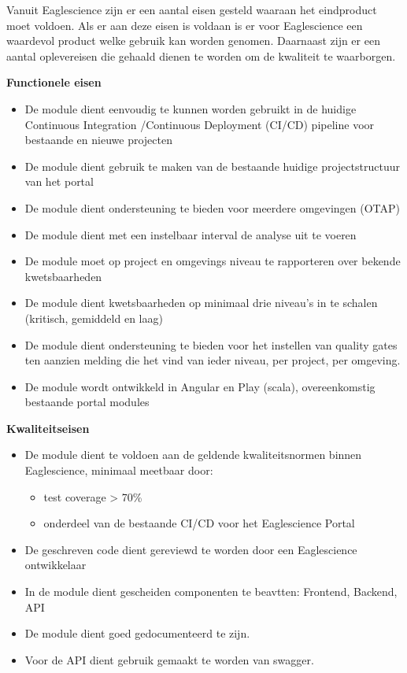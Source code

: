Vanuit Eaglescience zijn er een aantal eisen gesteld waaraan het eindproduct moet voldoen.
Als er aan deze eisen is voldaan is er voor Eaglescience een waardevol product welke gebruik kan worden genomen.
Daarnaast zijn er een aantal oplevereisen die gehaald dienen te worden om de kwaliteit te waarborgen.

\textbf{Functionele eisen}
\begin{itemize}
\item De module dient eenvoudig te kunnen worden gebruikt in de huidige Continuous Integration /Continuous Deployment (CI/CD) pipeline voor bestaande en nieuwe projecten
\item De module dient gebruik te maken van de bestaande huidige projectstructuur van het portal
\item De module dient ondersteuning te bieden voor meerdere omgevingen (OTAP)
\item De module dient met een instelbaar interval de analyse uit te voeren
\item De module moet op project en omgevings niveau te rapporteren over bekende kwetsbaarheden
\item De module dient kwetsbaarheden op minimaal drie niveau’s in te schalen (kritisch, gemiddeld en laag)
\item De module dient ondersteuning te bieden voor het instellen van quality gates ten aanzien melding die het vind van ieder niveau, per project, per omgeving.
\item De module wordt ontwikkeld in Angular en Play (scala), overeenkomstig bestaande portal modules
\end{itemize}
\textbf{Kwaliteitseisen}
\begin{itemize}
\item De module dient te voldoen aan de geldende kwaliteitsnormen binnen Eaglescience, minimaal meetbaar door:
	\begin{itemize}
	\item test coverage > 70\%
	\item onderdeel van de bestaande CI/CD voor het Eaglescience Portal
	\end{itemize}
\item De geschreven code dient gereviewd te worden door een Eaglescience ontwikkelaar
\item In de module dient gescheiden componenten te beavtten: Frontend, Backend, API
\item De module dient goed gedocumenteerd te zijn.
\item Voor de API dient gebruik gemaakt te worden van swagger.
\end{itemize}

